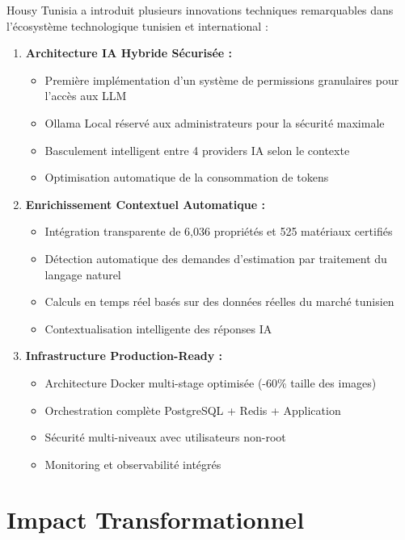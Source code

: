 Housy Tunisia a introduit plusieurs innovations techniques remarquables dans l'écosystème technologique tunisien et international :

\begin{enumerate}
    \item \textbf{Architecture IA Hybride Sécurisée :}
    \begin{itemize}
        \item Première implémentation d'un système de permissions granulaires pour l'accès aux LLM
        \item Ollama Local réservé aux administrateurs pour la sécurité maximale
        \item Basculement intelligent entre 4 providers IA selon le contexte
        \item Optimisation automatique de la consommation de tokens
    \end{itemize}
    
    \item \textbf{Enrichissement Contextuel Automatique :}
    \begin{itemize}
        \item Intégration transparente de 6,036 propriétés et 525 matériaux certifiés
        \item Détection automatique des demandes d'estimation par traitement du langage naturel
        \item Calculs en temps réel basés sur des données réelles du marché tunisien
        \item Contextualisation intelligente des réponses IA
    \end{itemize}
    
    \item \textbf{Infrastructure Production-Ready :}
    \begin{itemize}
        \item Architecture Docker multi-stage optimisée (-60\% taille des images)
        \item Orchestration complète PostgreSQL + Redis + Application
        \item Sécurité multi-niveaux avec utilisateurs non-root
        \item Monitoring et observabilité intégrés
    \end{itemize}
\end{enumerate}

\section{Impact Transformationnel}

